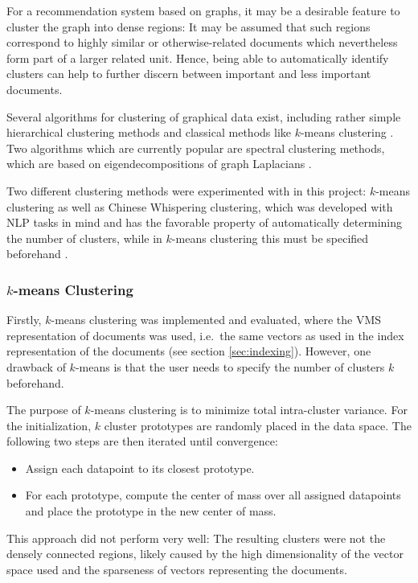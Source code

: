 For a recommendation system based on graphs, it may be a desirable feature to cluster the graph into
dense regions: It may be assumed that such regions correspond to highly similar or otherwise-related
documents which nevertheless form part of a larger related unit. Hence, being able to
automatically identify clusters can help to further discern between important and less important
documents.

Several algorithms for clustering of graphical data exist, including rather simple
hierarchical clustering methods and classical methods like $k$-means clustering
\cite{eosl2}. Two algorithms which are currently popular are spectral clustering
methods, which are based on eigendecompositions of graph Laplacians \cite{spectral_clustering}.

Two different clustering methods were experimented with in this project: $k$-means clustering
as well as Chinese Whispering clustering, which was developed with NLP tasks in mind and has the
favorable property of automatically determining the number of clusters, while in $k$-means clustering this must be specified beforehand \cite{cw_clustering}.

\subsubsection{$k$-means Clustering}
\label{sec:k-means_clustering}
Firstly, $k$-means clustering was implemented and evaluated, where the VMS representation of
documents was used, i.e.\ the same vectors as used in the index representation of the documents (see
section \ref{sec:indexing}). However, one drawback of $k$-means is that the user needs to specify
the number of clusters $k$ beforehand.

The purpose of $k$-means clustering is to minimize total intra-cluster variance. For the
initialization, $k$ cluster prototypes are randomly placed in the data space. The following two
steps are then iterated until convergence:
\begin{itemize}
  \item Assign each datapoint to its closest prototype.
  \item For each prototype, compute the center of mass over all assigned datapoints and place the
prototype in the new center of mass.
\end{itemize}

This approach did not perform very well: The resulting clusters were not the densely connected
regions, likely caused by the high dimensionality of the vector space used
and the sparseness of vectors representing the documents.

